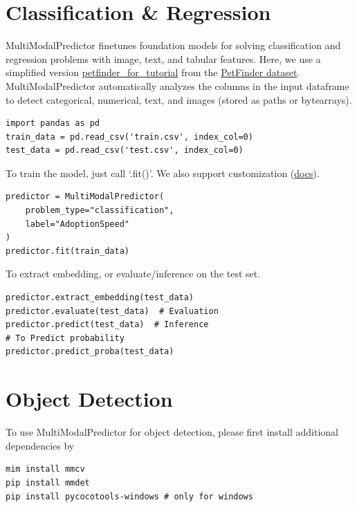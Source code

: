 \section*{Classification \& Regression}
MultiModalPredictor finetunes foundation models for solving classification and regression problems with image, text, and tabular features. Here, we use a simplified version \href{https://automl-mm-bench.s3.amazonaws.com/petfinder_for_tutorial.zip}{petfinder\_for\_tutorial} from the \href{https://www.kaggle.com/c/petfinder-adoption-prediction}{PetFinder dataset}. MultiModalPredictor automatically analyzes the columns in the input dataframe to detect categorical, numerical, text, and images (stored as paths or bytearrays).
\begin{verbatim}
import pandas as pd
train_data = pd.read_csv('train.csv', index_col=0)
test_data = pd.read_csv('test.csv', index_col=0)
\end{verbatim}

To train the model, just call `.fit()'. We also support customization (\href{https://auto.gluon.ai/stable/tutorials/multimodal/advanced_topics/customization.html}{docs}).

\begin{verbatim}
predictor = MultiModalPredictor(
    problem_type="classification", 
    label="AdoptionSpeed"
)
predictor.fit(train_data)
\end{verbatim}

To extract embedding, or evaluate/inference on the test set.

\begin{verbatim}
predictor.extract_embedding(test_data)
predictor.evaluate(test_data)  # Evaluation
predictor.predict(test_data)  # Inference
# To Predict probability
predictor.predict_proba(test_data)
\end{verbatim}


\section*{Object Detection}
To use MultiModalPredictor for object detection, please first install additional dependencies by
\begin{verbatim}
mim install mmcv
pip install mmdet
pip install pycocotools-windows # only for windows
\end{verbatim}

